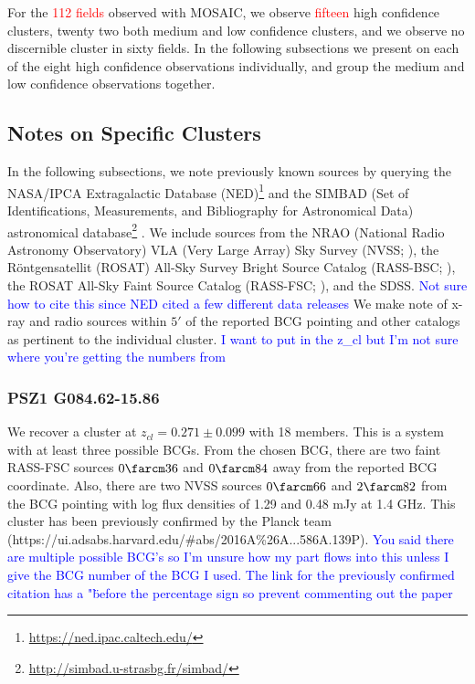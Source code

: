 \documentclass[apj, revtex4-1]{emulateapj}
\newcommand{\editorial}[1]{\textcolor{red}{#1}}
\newcommand{\peditorial}[1]{\textcolor{blue}{#1}}
\begin{document}
For the \editorial{112 fields} observed with MOSAIC, we observe \editorial{fifteen} high confidence clusters, twenty two both medium and low confidence clusters, and we observe no discernible cluster in sixty fields. In the following subsections we present on each of the eight high confidence observations individually, and group the medium and low confidence observations together.

\subsection{Notes on Specific Clusters}
In the following subsections, we note previously known sources by querying the NASA/IPCA Extragalactic Database (NED)\footnote{\url{https://ned.ipac.caltech.edu/}} and the SIMBAD (Set of Identifications, Measurements, and Bibliography for Astronomical Data) astronomical database\footnote{\url{http://simbad.u-strasbg.fr/simbad/}} \citep{Wenger2000}. We include sources from the NRAO (National Radio
Astronomy Observatory) VLA (Very Large Array) Sky Survey (NVSS; \citealt{Condon1998}), the R\"{o}ntgensatellit (ROSAT) All-Sky Survey Bright Source Catalog (RASS-BSC; \citealt{Voges1999a}), the ROSAT All-Sky Faint Source Catalog (RASS-FSC; \citealt{Voges2000}), and the SDSS. \peditorial{Not sure how to cite this since NED cited a few different data releases} We make note of x-ray and radio sources within $5'$ of the reported BCG pointing and other catalogs as pertinent to the individual cluster. \peditorial{I want to put in the z_cl but I'm not sure where you're getting the numbers from}

\subsubsection{PSZ1 G084.62-15.86}
We recover a cluster at $z_{cl} = 0.271 \pm 0.099$ with 18 members. This is a system with at least three possible BCGs. From the chosen BCG, there are two faint RASS-FSC sources $0\farcm36$ and $0\farcm84$ away from the reported BCG coordinate. Also, there are two NVSS sources $0\farcm66$ and $2\farcm82$ from the BCG pointing with log flux densities of 1.29 and 0.48 mJy at 1.4 GHz. This cluster has been previously confirmed by the Planck team (https://ui.adsabs.harvard.edu/#abs/2016A\%26A...586A.139P). \peditorial{You said there are multiple possible BCG's so I'm unsure how my part flows into this unless I give the BCG number of the BCG I used.} \peditorial{The link for the previously confirmed citation has a "\" before the percentage sign so prevent commenting out the paper}
\end{document}
